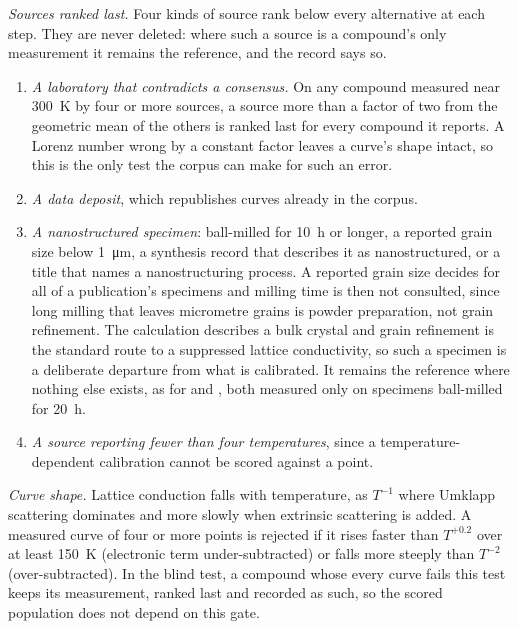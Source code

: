 \documentclass[preprint, 12pt]{elsarticle}
\begin{document}
\emph{Sources ranked last.} Four kinds of source rank below every alternative at each step. They are
never deleted: where such a source is a compound's only measurement it remains the reference, and the
record says so.
\begin{enumerate}
  \item \emph{A laboratory that contradicts a consensus.} On any compound measured near
        \SI{300}{\kelvin} by four or more sources, a source more than a factor of two from the
        geometric mean of the others is ranked last for every compound it reports. A Lorenz number
        wrong by a constant factor leaves a curve's shape intact, so this is the only test the corpus
        can make for such an error.
  \item \emph{A data deposit}, which republishes curves already in the corpus.
  \item \emph{A nanostructured specimen}: ball-milled for \SI{10}{\hour} or longer, a reported grain
        size below \SI{1}{\micro\metre}, a synthesis record that describes it as nanostructured, or a
        title that names a nanostructuring process. A reported grain size decides for all of a
        publication's specimens and milling time is then not consulted, since long milling that
        leaves micrometre grains is powder preparation, not grain refinement. The calculation
        describes a bulk crystal and grain refinement is the standard route to a suppressed lattice
        conductivity, so such a specimen is a deliberate departure from what is calibrated. It
        remains the reference where nothing else exists, as for  and , both
        measured only on specimens ball-milled for \SI{20}{\hour}.
  \item \emph{A source reporting fewer than four temperatures}, since a temperature-dependent
        calibration cannot be scored against a point.
\end{enumerate}

\emph{Curve shape.} Lattice conduction falls with temperature, as $T^{-1}$ where Umklapp scattering
dominates and more slowly when extrinsic scattering is added. A measured curve of four or more
points is rejected if it rises faster than $T^{+0.2}$ over at least \SI{150}{\kelvin} (electronic term
under-subtracted) or falls more steeply than $T^{-2}$ (over-subtracted). In the blind test, a compound
whose every curve fails this test keeps its measurement, ranked last and recorded as such, so the
scored population does not depend on this gate.
\end{document}
